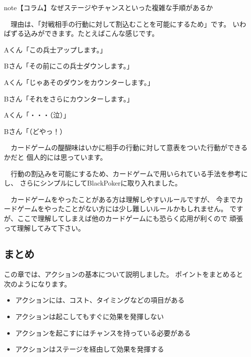 \documentclass[letterpaper,10pt,dvipdfmx]{sphinxmanual}
\begin{document}
\begin{sphinxadmonition}{note}{【コラム】なぜステージやチャンスといった複雑な手順があるか}

　理由は、「対戦相手の行動に対して割込むことを可能にするため」です。
いわばずる込みができます。たとえばこんな感じです。

\begin{DUlineblock}{0em}
\item[] Aくん「この兵士アップします。」
\item[] Bさん「その前にこの兵士ダウンします。」
\item[] Aくん「じゃあそのダウンをカウンターします。」
\item[] Bさん「それをさらにカウンターします。」
\item[] Aくん「・・・（泣）」
\item[] Bさん「（どやっ！）
\end{DUlineblock}

　カードゲームの醍醐味はいかに相手の行動に対して意表をついた行動ができるかだと
個人的には思っています。

　行動の割込みを可能にするため、カードゲームで用いられている手法を参考にし、
さらにシンプルにしてBlackPokerに取り入れました。

　カードゲームをやったことがある方は理解しやすいルールですが、
今までカードゲームをやったことがない方には少し難しいルールかもしれません。
ですが、ここで理解してしまえば他のカードゲームにも恐らく応用が利くので
頑張って理解してみて下さい。
\end{sphinxadmonition}


\subsection{まとめ}
\label{\detokenize{common/03-action:id31}}
この章では、アクションの基本について説明しました。
ポイントをまとめると次のようになります。
\begin{itemize}
\item {} 
アクションには、コスト、タイミングなどの項目がある

\item {} 
アクションは起こしてもすぐに効果を発揮しない

\item {} 
アクションを起こすにはチャンスを持っている必要がある

\item {} 
アクションはステージを経由して効果を発揮する

\end{itemize}
\end{document}
